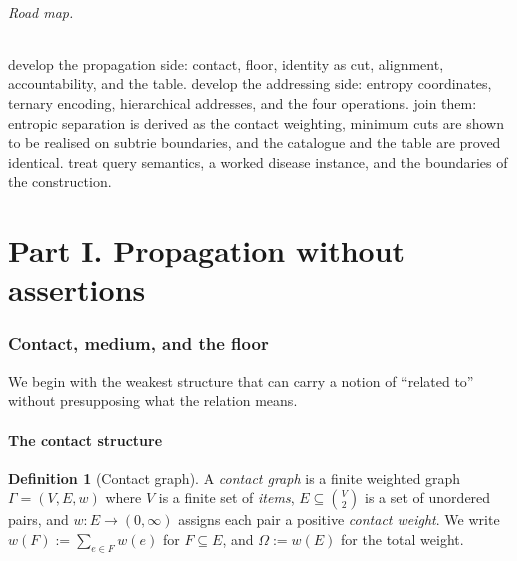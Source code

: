\documentclass[11pt,twocolumn,a4paper]{article}
\theoremstyle{thmstyle}
\theoremstyle{definition}
\newtheorem{definition}[theorem]{Definition}
\theoremstyle{remark}
\newcommand{\Gph}{\Gamma}
\newcommand{\V}{V}
\newcommand{\E}{E}
\newcommand{\wt}{w}
\begin{document}
\paragraph{Road map.}
 develop the
propagation side: contact, floor, identity as cut, alignment,
accountability, and the table.  develop the addressing side: entropy coordinates,
ternary encoding, hierarchical addresses, and the four operations.
 join them: entropic separation
is derived as the contact weighting, minimum cuts are shown to be
realised on subtrie boundaries, and the catalogue and the table are
proved identical.  treat query
semantics, a worked disease instance, and the boundaries of the
construction.

\part*{Part I. Propagation without assertions}

\section{Contact, medium, and the floor}
\label{sec:floor}

We begin with the weakest structure that can carry a notion of
``related to'' without presupposing what the relation means.

\subsection{The contact structure}

\begin{definition}[Contact graph]
\label{def:contact}
A \emph{contact graph} is a finite weighted graph
$\Gph = (\V, \E, \wt)$ where $\V$ is a finite set of \emph{items},
$\E \subseteq \binom{\V}{2}$ is a set of unordered pairs, and
$\wt \colon \E \to (0, \infty)$ assigns each pair a positive
\emph{contact weight}. We write $\wt(F) := \sum_{e \in F} \wt(e)$
for $F \subseteq \E$, and $\Omega := \wt(\E)$ for the total weight.
\end{definition}
\end{document}
